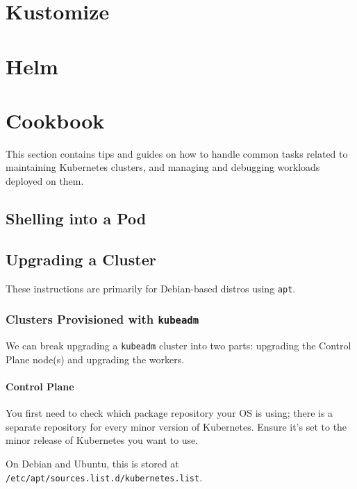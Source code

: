 \documentclass[11pt, a4paper]{article}
\begin{document}
\section{Kustomize}

\section{Helm}

\section{Cookbook}

This section contains tips and guides on how to handle common tasks related to maintaining Kubernetes clusters, and managing and debugging workloads deployed on them.

\subsection{Shelling into a Pod}

\subsection{Upgrading a Cluster}

These instructions are primarily for Debian-based distros using \texttt{apt}.

\subsubsection{Clusters Provisioned with \texttt{kubeadm}}

We can break upgrading a \texttt{kubeadm} cluster into two parts: upgrading the Control Plane node(s) and upgrading the workers. 

\paragraph{Control Plane}\mbox{}

You first need to check which package repository your OS is using; there is a separate repository for every minor version of Kubernetes. Ensure it's set to the minor release of Kubernetes you want to use. 

On Debian and Ubuntu, this is stored at \texttt{/etc/apt/sources.list.d/kubernetes.list}.
\end{document}
